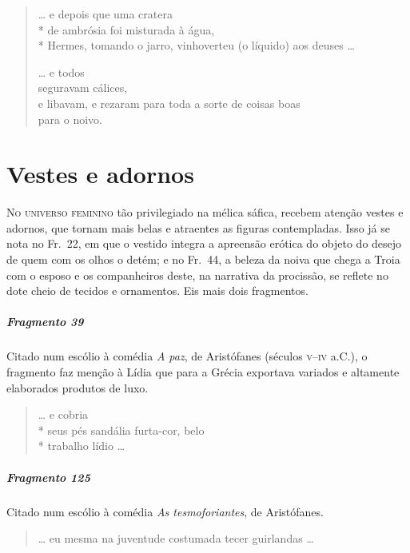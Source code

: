 {\begin{verse}
\ldots{} e depois que uma cratera\\*
de ambrósia foi misturada à água,\\*
Hermes, tomando o jarro, vinhoverteu (o líquido) aos deuses \ldots{}

\ldots{} e todos\\
seguravam cálices,\\
e libavam, e rezaram para toda a sorte de coisas boas\\
para o noivo.
\end{verse}

\chapter{Vestes e adornos}

\textsc{No universo feminino} tão privilegiado na mélica sáfica, recebem atenção vestes e
adornos, que tornam mais belas e atraentes as figuras contempladas. Isso já se
nota no Fr.~22, em que o vestido integra a apreensão erótica do objeto do
desejo de quem com os olhos o detém; e no Fr.~44, a beleza da noiva que chega a
Troia com o esposo e os companheiros deste, na narrativa da procissão, se
reflete no dote cheio de tecidos e ornamentos. Eis mais dois fragmentos.


\paragraph{Fragmento 39}

{\small Citado num escólio à comédia \textit{A paz}, de Aristófanes (séculos \textsc{v}--\textsc{iv} a.C.),
o fragmento faz menção à Lídia que para a Grécia exportava variados e altamente
elaborados produtos de luxo.}

\begin{verse}
\ldots{} e cobria\\*
seus pés sandália furta-cor, belo\\*
trabalho lídio \ldots{}
\end{verse}

\paragraph{Fragmento 125}

{\small Citado num escólio à comédia \textit{As tesmoforiantes}, de Aristófanes.}

\begin{verse}
\ldots{} eu mesma na juventude costumada tecer guirlandas \ldots{}
\end{verse}


}
